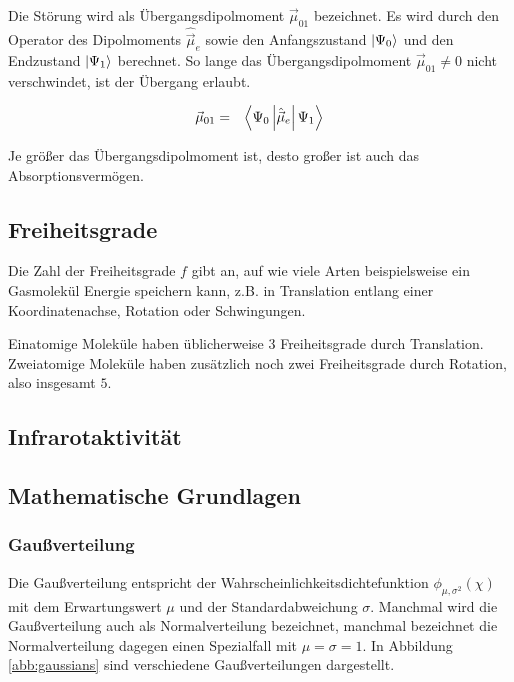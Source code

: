 \documentclass[12pt,a4paper]{scrartcl}
\numberwithin{equation}{section} %
\renewcommand{\[}{} %
\renewcommand{\]}{\noindent} %
\begin{document}
Die Störung wird als Übergangsdipolmoment \(\vec\mu_{01}\) bezeichnet. Es wird durch den Operator des Dipolmoments \(\hat {\vec \mu}_e\) sowie den Anfangszustand \(\ket{\Psi_0}\) und den Endzustand \(\ket{\Psi_1}\) berechnet. So lange das Übergangsdipolmoment \(\vec\mu_{01}\neq0\) nicht verschwindet, ist der Übergang erlaubt.

\[
\begin{eqnarray}
    \vec \mu_{01} &=& \expval{\Psi_0\left|\hat {\vec \mu}_e\right|\Psi_1}
\end{eqnarray}
\]

\noindent
Je größer das Übergangsdipolmoment ist, desto großer ist auch das Absorptionsvermögen.

\hypertarget{freiheitsgrade}{%
\subsection{Freiheitsgrade}\label{freiheitsgrade}}

Die Zahl der Freiheitsgrade \(f\) gibt an, auf wie viele Arten
beispielsweise ein Gasmolekül Energie speichern kann, z.B. in
Translation entlang einer Koordinatenachse, Rotation oder Schwingungen.

Einatomige Moleküle haben üblicherweise \(3\) Freiheitsgrade durch
Translation. Zweiatomige Moleküle haben zusätzlich noch zwei
Freiheitsgrade durch Rotation, also insgesamt \(5\).

\hypertarget{infrarotaktivituxe4t}{%
\subsection{Infrarotaktivität}\label{infrarotaktivituxe4t}}

\hypertarget{mathematische-grundlagen}{%
\subsection{Mathematische Grundlagen}\label{mathematische-grundlagen}}

\hypertarget{gauuxdfverteilung}{%
\subsubsection{Gaußverteilung}\label{gauuxdfverteilung}}

Die Gaußverteilung entspricht der Wahrscheinlichkeitsdichtefunktion \(\phi_{\mu,\sigma^2}(\chi)\) mit dem Erwartungswert \(\mu\) und der Standardabweichung \(\sigma\). Manchmal wird die Gaußverteilung auch als Normalverteilung bezeichnet, manchmal bezeichnet die Normalverteilung dagegen einen Spezialfall mit \(\mu=\sigma=1\). In Abbildung \ref{abb:gaussians} sind verschiedene Gaußverteilungen dargestellt.
\end{document}
